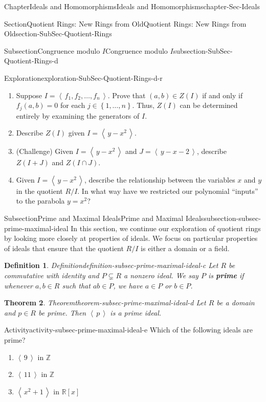 \documentclass[oneside,10pt,]{book}
\newcommand{\terminology}[1]{\textbf{#1}}
\numberwithin{equation}{section}
\newcommand{\ideal}[1]{\left\langle\, #1 \,\right\rangle}
\newcommand{\set}[1]{\left\{ {#1} \right\}}
\def\Z{{\mathbb Z}}
\def\R{{\mathbb R}}
\newtheorem{theorem}{Theorem}[section]
\newtheorem{definition}[theorem]{Definition}
\begin{document}
\begin{chapterptx}{Chapter}{Ideals and Homomorphisms}{}{Ideals and Homomorphisms}{}{}{chapter-Sec-Ideals}
\begin{sectionptx}{Section}{Quotient Rings: New Rings from Old}{}{Quotient Rings: New Rings from Old}{}{}{section-SubSec-Quotient-Rings}
\begin{subsectionptx}{Subsection}{Congruence modulo \(I\)}{}{Congruence modulo \(I\)}{}{}{subsection-SubSec-Quotient-Rings-d}
\begin{exploration}{Exploration}{}{exploration-SubSec-Quotient-Rings-d-r}
%
\begin{enumerate}
\item{}Suppose \(I = \ideal{f_1, f_2, \ldots, f_n}\). Prove that \((a,b)\in Z(I)\) if and only if \(f_j(a,b) = 0\) for each \(j\in \set{1,\ldots, n}\). Thus, \(Z(I)\) can be determined entirely by examining the generators of \(I\).%
\item{}Describe \(Z(I)\) given \(I = \ideal{y-x^2}\).%
\item{}(Challenge) Given \(I = \ideal{y-x^2}\) and \(J = \ideal{y-x-2}\), describe \(Z(I+J)\) and \(Z(I\cap J)\).%
\item{}Given \(I=\ideal{y-x^2}\), describe the relationship between the variables \(x\) and \(y\) in the quotient \(R/I\). In what way have we restricted our polynomial ``inputs'' to the parabola \(y = x^2\)?%
\end{enumerate}
\end{exploration}%
\end{subsectionptx}
%
%
\typeout{************************************************}
\typeout{************************************************}
%
\begin{subsectionptx}{Subsection}{Prime and Maximal Ideals}{}{Prime and Maximal Ideals}{}{}{subsection-subsec-prime-maximal-ideal}
In this section, we continue our exploration of quotient rings by looking more closely at properties of ideals. We focus on particular properties of ideals that ensure that the quotient \(R/I\) is either a domain or a field.%
\begin{definition}{Definition}{}{definition-subsec-prime-maximal-ideal-c}%
%
%
Let \(R\) be commutative with identity and \(P\subsetneq R\) a nonzero ideal. We say \(P\) is \terminology{prime} if whenever \(a,b\in R\) such that \(ab\in P\), we have \(a\in P\) or \(b\in P\).%
\end{definition}
\begin{theorem}{Theorem}{}{}{theorem-subsec-prime-maximal-ideal-d}%
Let \(R\) be a domain and \(p\in R\) be prime. Then \(\ideal{p}\) is a prime ideal.%
\end{theorem}
\begin{activity}{Activity}{}{activity-subsec-prime-maximal-ideal-e}%
Which of the following ideals are prime?%
\begin{enumerate}
\item{}\(\ideal{9}\) in \(\Z\)%
\item{}\(\ideal{11}\) in \(\Z\)%
\item{}\(\ideal{x^2+1}\) in \(\R[x]\)%

\end{enumerate}
\end{activity}
\end{subsectionptx}
\end{sectionptx}
\end{chapterptx}
\end{document}
